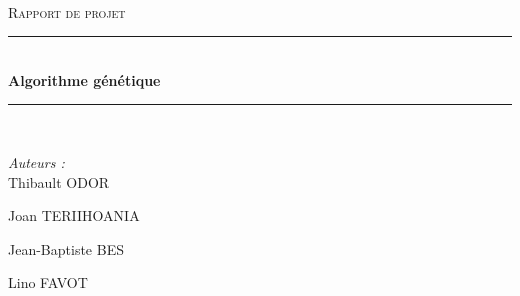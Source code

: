 \documentclass{article}
\begin{document}
\begin{titlepage}
\newcommand{\HRule}{\rule{\linewidth}{0.1mm}}
\center %
 
\textsc{\Large }\\[0.5cm] %
\textsc{\Large Rapport de projet}\\[0.5cm] %

\HRule \\[0.4cm]
{ \huge \bfseries Algorithme génétique}\\[0.1cm] %
\HRule \\[1.5cm]
 

\begin{minipage}{0.4\textwidth}

\begin{flushleft} \large
\emph{Auteurs :}\\
Thibault \textsc{ODOR}\\  %
\end{flushleft}

\begin{flushleft} \large
Joan \textsc{TERIIHOANIA}\\  %
\end{flushleft}

\begin{flushleft} \large
Jean-Baptiste \textsc{BES}\\  %
\end{flushleft}

\begin{flushleft} \large
Lino \textsc{FAVOT}\\  %
\end{flushleft}



\end{minipage}
\end{titlepage}
\end{document}
